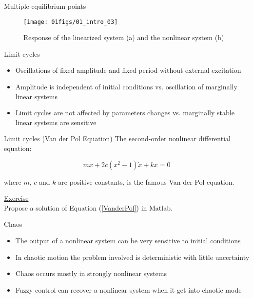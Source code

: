 \documentclass{beamer}
\begin{document}
\begin{frame}{Multiple equilibrium points}
\begin{figure}[h]
	\begin{center}
		\texttt{[image: 01figs/01\_intro\_03]}
		\caption{Response of the linearized system (a) and the nonlinear system (b)}
	\end{center}
\end{figure}
\end{frame}

\begin{frame}{Limit cycles}
\begin{itemize}
	\item Oscillations of fixed amplitude and fixed period without external excitation
	\item Amplitude is independent of initial conditions vs. oscillation of marginally linear systems
	\item Limit cycles are not affected by parameters changes vs. marginally stable linear systems are sensitive
\end{itemize}
\end{frame}

\begin{frame}{Limit cycles (Van der Pol Equation)}
The second-order nonlinear differential equation:

\begin{equation} \label{VanderPol}
m\ddot{x} + 2c\left( x^2 - 1 \right)\dot{x} + kx = 0
\end{equation}

where $m$, $c$ and $k$ are positive constants, is the famous Van der Pol equation. \vspace{1em}

\underline{Exercise}\\
Propose a solution of Equation (\ref{VanderPol}) in Matlab.
\end{frame}

\begin{frame}{Chaos}
\begin{itemize}
	\item The output of a nonlinear system can be very sensitive to initial conditions
	\item In chaotic motion the problem involved is deterministic with little uncertainty
	\item Chaos occurs mostly in strongly nonlinear systems
	\item Fuzzy control can recover a nonlinear system when it get into chaotic mode
\end{itemize}
\end{frame}
\end{document}
